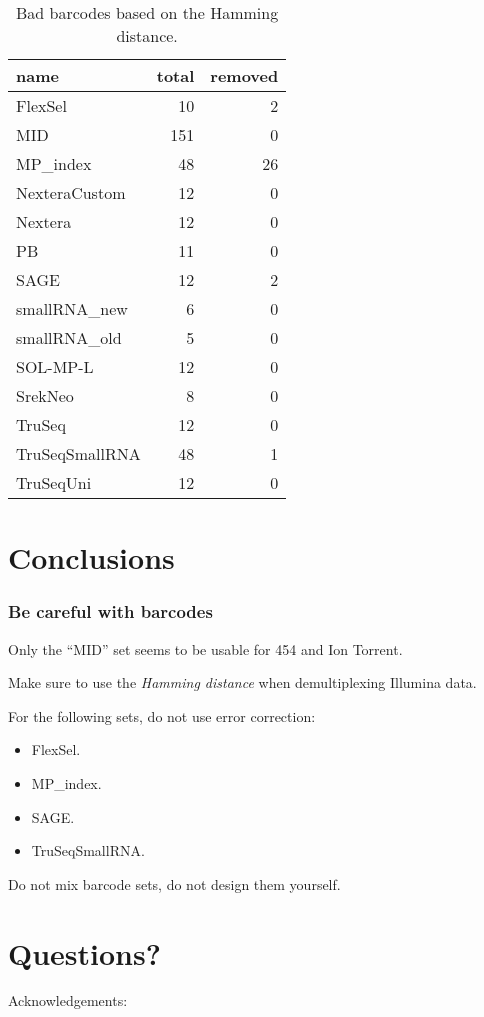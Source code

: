 \documentclass[slidestop]{beamer}
\begin{document}
\begin{frame}
  \begin{table}[]
    \begin{center}
      {\small
        \begin{tabular}{lrr}
          name            & total & removed\\
          \hline
          FlexSel         &  10   &  2\\
          MID             & 151   &  0\\
          MP\_index       &  48   & 26\\
          NexteraCustom   &  12   &  0\\
          Nextera         &  12   &  0\\
          PB              &  11   &  0\\
          SAGE            &  12   &  2\\
          smallRNA\_new   &   6   &  0\\
          smallRNA\_old   &   5   &  0\\
          SOL-MP-L        &  12   &  0\\
          SrekNeo         &   8   &  0\\
          TruSeq          &  12   &  0\\
          TruSeqSmallRNA  &  48   &  1\\
          TruSeqUni       &  12   &  0\\
        \end{tabular}
      }
    \end{center}
    \caption{Bad barcodes based on the Hamming distance.}
  \end{table}
\end{frame}

\section{Conclusions}
\begin{frame}
  \frametitle{Be careful with barcodes}

  Only the ``MID'' set seems to be usable for 454 and Ion Torrent.
  \bigskip
  \pause

  Make sure to use the \emph{Hamming distance} when demultiplexing Illumina
  data.
  \bigskip
  \pause

  For the following sets, do not use error correction:
  \begin{itemize}
    \item FlexSel.
    \item MP\_index.
    \item SAGE.
    \item TruSeqSmallRNA.
  \end{itemize}
  \bigskip
  \bigskip
  \pause

  Do not mix barcode sets, do not design them yourself.
\end{frame}

\section{Questions?}
\lastpagetemplate
\begin{frame}
  \begin{center}
    Acknowledgements:
    \bigskip
    \bigskip

  \end{center}
\end{frame}
\end{document}
